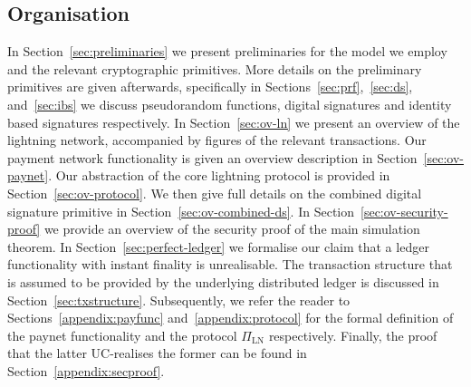 \subsection{Organisation}
In Section~\ref{sec:preliminaries} we present preliminaries for the model we
employ and the relevant cryptographic primitives. More details on the
preliminary primitives are given afterwards, specifically in
Sections~\ref{sec:prf},~\ref{sec:ds}, and~\ref{sec:ibs} we discuss pseudorandom
functions, digital signatures and identity based signatures respectively. In
Section~\ref{sec:ov-ln} we present an overview of the lightning network,
accompanied by figures of the relevant transactions. Our payment network
functionality is given an overview description in Section~\ref{sec:ov-paynet}.
Our abstraction of the core lightning protocol is provided in
Section~\ref{sec:ov-protocol}. We then give full details on the combined digital
signature primitive in Section~\ref{sec:ov-combined-ds}. In
Section~\ref{sec:ov-security-proof} we provide an overview of the security proof
of the main simulation theorem. In Section~\ref{sec:perfect-ledger} we formalise
our claim that a ledger functionality with instant finality is unrealisable. The
transaction structure that is assumed to be provided by the underlying
distributed ledger is discussed in Section~\ref{sec:txstructure}. Subsequently,
we refer the reader to Sections~\ref{appendix:payfunc}
and~\ref{appendix:protocol} for the formal definition of the paynet
functionality \fpaynet{} and the protocol $\Pi_{\mathrm{LN}}$ respectively.
Finally, the proof that the latter UC-realises the former can be found in
Section~\ref{appendix:secproof}.

